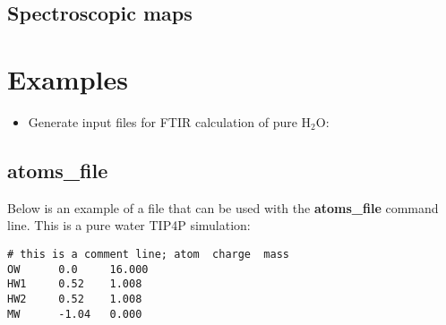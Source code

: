 \documentclass{article}
\begin{document}
\begin{itemize}
\subsection{Spectroscopic maps}

\section{Examples}
\begin{itemize}

\item Generate input files for FTIR calculation of pure H$_2$O:


\end{itemize}

 

\end{itemize}

\begin{appendix}
\section{\label{app:atomsf}atoms\_file}
Below is an example of a file that can be used with the \textbf{atoms\_file} command line. This is a pure water TIP4P simulation:
\begin{verbatim}
# this is a comment line; atom  charge  mass
OW      0.0     16.000
HW1     0.52    1.008
HW2     0.52    1.008
MW      -1.04   0.000
\end{verbatim}

\end{appendix}
\end{document}
